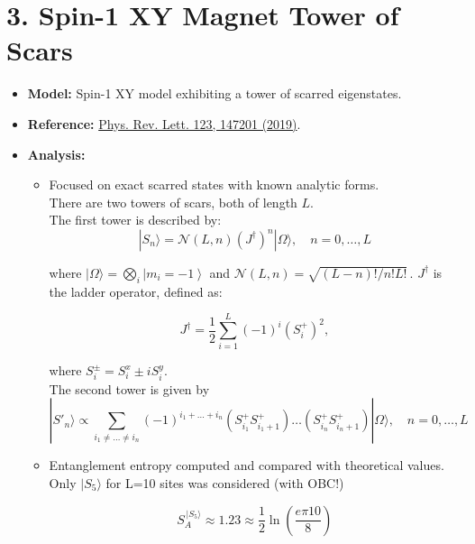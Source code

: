 \documentclass[11pt]{article}
\begin{document}
\section*{3. Spin-1 XY Magnet Tower of Scars}
\begin{itemize}
    \item \textbf{Model:} Spin-1 XY model exhibiting a tower of scarred eigenstates.
	
    \item \textbf{Reference:} \href{https://journals.aps.org/prl/pdf/10.1103/PhysRevLett.123.147201}{Phys. Rev. Lett. 123, 147201 (2019)}.
    \item \textbf{Analysis:}
    \begin{itemize}
        \item Focused on exact scarred states with known analytic forms.\\ There are two towers of scars, both of length $L$.\\
    The first tower is described by:
	    \begin{equation}
	|S_n\rangle = \mathcal{N}(L, n) \left(J^\dagger\right)^n |\Omega\rangle, \quad n = 0,\hdots,L
	\end{equation}
	
	where $|\Omega\rangle = \bigotimes_i \left| m_i = -1 \right\rangle$ and $\mathcal{N}(L, n) = \sqrt{(L-n)!/n!L!}\,$. $J^\dagger$ is the ladder operator, defined as:
	
	\begin{equation}
	J^\dagger = \frac{1}{2}\sum_{i=1}^{L} (-1)^i \left(S^+_i\right)^2, 
	\end{equation}
	
	where $S_i^\pm = S_i^x \pm i S_i^y$.\\
     The second tower is given by 
     \begin{equation}
	|S'_n\rangle \propto \sum_{i_1 \neq \hdots \neq i_n} (-1)^{i_1 + \hdots + i_n} \left(S^+_{i_1}S^+_{i_1+1}\right)\hdots\left(S^+_{i_n}S^+_{i_n+1}\right)  |\Omega\rangle, \quad n = 0,\hdots,L
	\end{equation}
        \item Entanglement entropy computed and compared with theoretical values.
        Only $|S_5\rangle$ for L=10 sites was considered (with OBC!)
        
         \begin{equation}
        S^{\,|S_5\rangle}_A \approx 1.23 \approx \frac{1}{2} \ln \left(\frac{e \pi 10}{8}\right)
        \end{equation}
        

\end{itemize}
\end{itemize}
\end{document}
